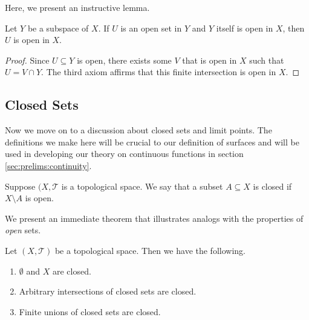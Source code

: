 Here, we present an instructive lemma.

\begin{lem}
  Let $Y$ be a subspace of $X$. If $U$ is an open set in $Y$ and $Y$
  itself is open in $X$, then $U$ is open in $X$.
\end{lem}

\begin{proof}
  Since $U \subseteq Y$ is open, there exists some $V$ that is open in
  $X$ such that $U = V \cap Y$. The third axiom affirms that this
  finite intersection is open in $X$. 
\end{proof}

\subsection{Closed Sets}
\label{sec:prelims:closed}

Now we move on to a discussion about closed sets and limit points. The
definitions we make here will be crucial to our definition of surfaces
and will be used in developing our theory on continuous functions in
section \ref{sec:prelims:continuity}.

\begin{defn}
  Suppose $(X,\mathscr{T}$ is a topological space. We say that a
  subset $A \subseteq X$ is closed if $X \setminus A$ is open.
\end{defn}

We present an immediate theorem that illustrates analogs with the
properties of \emph{open} sets.

\begin{thm}
  Let $(X,\mathscr{T})$ be a topological space. Then we have the
  following. 
  \begin{enumerate}
  \item $\emptyset$ and $X$ are closed.
  \item Arbitrary intersections of closed sets are closed.
  \item Finite unions of closed sets are closed.
  \end{enumerate}
\end{thm}

